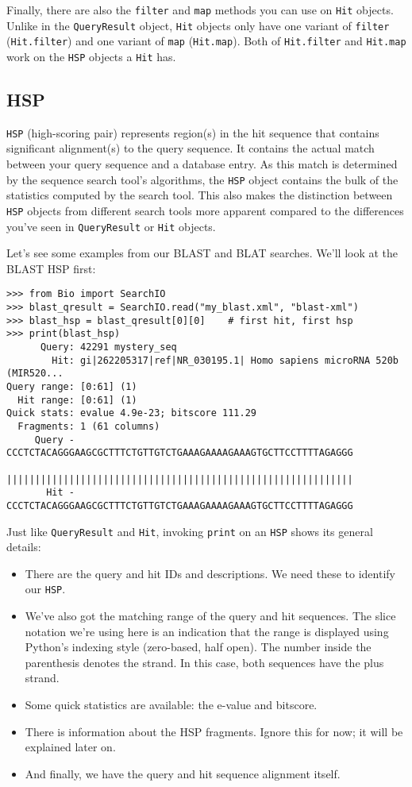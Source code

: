 Finally, there are also the \verb|filter| and \verb|map| methods you can use
on \verb|Hit| objects. Unlike in the \verb|QueryResult| object, \verb|Hit|
objects only have one variant of \verb|filter| (\verb|Hit.filter|) and one
variant of \verb|map| (\verb|Hit.map|). Both of \verb|Hit.filter| and
\verb|Hit.map| work on the \verb|HSP| objects a \verb|Hit| has.

\subsection{HSP}
\label{sec:searchio-hsp}

\verb|HSP| (high-scoring pair) represents region(s) in the hit sequence that
contains significant alignment(s) to the query sequence. It contains the actual
match between your query sequence and a database entry. As this match is
determined by the sequence search tool's algorithms, the \verb|HSP| object
contains the bulk of the statistics computed by the search tool. This also makes
the distinction between \verb|HSP| objects from different search tools more
apparent compared to the differences you've seen in \verb|QueryResult| or
\verb|Hit| objects.

Let's see some examples from our BLAST and BLAT searches. We'll look at the
BLAST HSP first:

\begin{verbatim}
>>> from Bio import SearchIO
>>> blast_qresult = SearchIO.read("my_blast.xml", "blast-xml")
>>> blast_hsp = blast_qresult[0][0]    # first hit, first hsp
>>> print(blast_hsp)
      Query: 42291 mystery_seq
        Hit: gi|262205317|ref|NR_030195.1| Homo sapiens microRNA 520b (MIR520...
Query range: [0:61] (1)
  Hit range: [0:61] (1)
Quick stats: evalue 4.9e-23; bitscore 111.29
  Fragments: 1 (61 columns)
     Query - CCCTCTACAGGGAAGCGCTTTCTGTTGTCTGAAAGAAAAGAAAGTGCTTCCTTTTAGAGGG
             |||||||||||||||||||||||||||||||||||||||||||||||||||||||||||||
       Hit - CCCTCTACAGGGAAGCGCTTTCTGTTGTCTGAAAGAAAAGAAAGTGCTTCCTTTTAGAGGG
\end{verbatim}

Just like \verb|QueryResult| and \verb|Hit|, invoking \verb|print| on an
\verb|HSP| shows its general details:
\begin{itemize}
\item There are the query and hit IDs and descriptions. We need these to
    identify our \verb|HSP|.
\item We've also got the matching range of the query and hit sequences. The
    slice notation we're using here is an indication that the range is displayed
    using Python's indexing style (zero-based, half open). The number inside the
    parenthesis denotes the strand. In this case, both sequences have the plus
    strand.
\item Some quick statistics are available: the e-value and bitscore.
\item There is information about the HSP fragments. Ignore this for now; it will
    be explained later on.
\item And finally, we have the query and hit sequence alignment itself.
\end{itemize}

